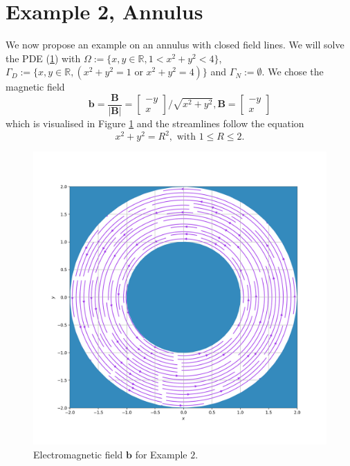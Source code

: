 \documentclass[12pt]{ociamthesis}
\begin{document}
\section{Example 2, Annulus}
We now propose an example on an annulus with closed field lines.
We will solve the PDE (\ref{}) with $\Omega := \{x,y \in \mathbb{R}, 1<x^2+y^2<4\}$, $\Gamma_D := \{x,y \in \mathbb{R}, (x^2+y^2=1 \text{ or } x^2+y^2=4)\}$ and $\Gamma_N := \emptyset$. We chose the magnetic field 
\begin{equation}
\mathbf{b} = \frac{\mathbf{B}}{|\mathbf{B}|} = 
\left[ \begin{matrix}
-y\\
 x
\end{matrix} \right]/\sqrt{x^2+y^2}, 
\mathbf{B} = \left[ \begin{matrix}
-y\\
 x
\end{matrix} \right]
\end{equation}
which is visualised in Figure \ref{E2_VF} and the streamlines follow the equation
\begin{equation}
x^2 + y^2 = R^2, \text{ with } 1\leq R \leq 2.
\end{equation}
\begin{figure}[H]
 \includegraphics[width=\textwidth]{Pics/VectorField/E2b.png}
  \caption{Electromagnetic field $\mathbf{b}$ for Example $2$.}
 \label{E2_VF}
\end{figure}
\end{document}
